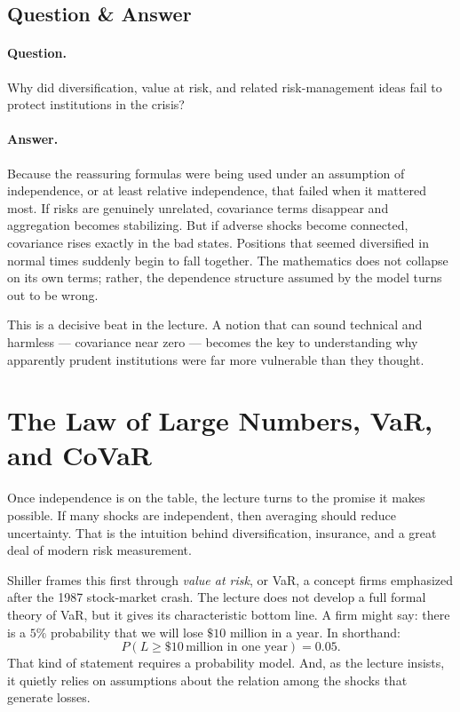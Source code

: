 \subsection{Question \& Answer}

\paragraph{Question.}
Why did diversification, value at risk, and related risk-management ideas fail to protect institutions in the crisis?

\paragraph{Answer.}
Because the reassuring formulas were being used under an assumption of independence, or at least relative independence, that failed when it mattered most. If risks are genuinely unrelated, covariance terms disappear and aggregation becomes stabilizing. But if adverse shocks become connected, covariance rises exactly in the bad states. Positions that seemed diversified in normal times suddenly begin to fall together. The mathematics does not collapse on its own terms; rather, the dependence structure assumed by the model turns out to be wrong.

This is a decisive beat in the lecture. A notion that can sound technical and harmless --- covariance near zero --- becomes the key to understanding why apparently prudent institutions were far more vulnerable than they thought.

\section{The Law of Large Numbers, VaR, and CoVaR}

Once independence is on the table, the lecture turns to the promise it makes possible. If many shocks are independent, then averaging should reduce uncertainty. That is the intuition behind diversification, insurance, and a great deal of modern risk measurement.

Shiller frames this first through \emph{value at risk}, or VaR, a concept firms emphasized after the 1987 stock-market crash. The lecture does not develop a full formal theory of VaR, but it gives its characteristic bottom line. A firm might say: there is a \(5\%\) probability that we will lose \(\$10\) million in a year. In shorthand:
\begin{equation}
P\!\left(L\ge \$10\,\text{million in one year}\right)=0.05.
\end{equation}
That kind of statement requires a probability model. And, as the lecture insists, it quietly relies on assumptions about the relation among the shocks that generate losses.

